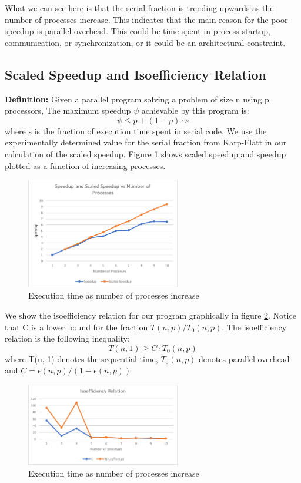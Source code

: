 \documentclass{article}
\begin{document}
\medskip
\noindent
What we can see here is that the serial fraction is trending upwards as the 
number of processes increase. This indicates that the main reason for the poor 
speedup is parallel overhead. This could be time spent in process startup, 
communication, or synchronization, or it could be an architectural constraint.

\subsection{Scaled Speedup and Isoefficiency Relation}

\medskip
\noindent
\textbf{Definition:} Given a parallel program solving a problem of size n using 
p processors, The maximum speedup $\psi$ achievable by this program is:
\[\psi \leq p+(1-p) \cdot s\] where s is the fraction of execution time spent in
serial code. We  use the experimentally determined value for the serial fraction
from Karp-Flatt in our calculation of the scaled speedup. Figure 
\ref{fig:scaled_speedup} shows scaled speedup and speedup plotted as a function 
of increasing processes.

\begin{figure}[ht]
	\centering
    \includegraphics[width=0.6\textwidth]{scaled_speedup.png}
    \caption{Execution time as number of processes increase}
    \label{fig:scaled_speedup}
\end{figure}

\medskip
\noindent
We show the isoefficiency relation for our program graphically in figure 
\ref{fig:isoefficiency}. Notice that C is a lower bound for the fraction 
$T(n,p)/T_0(n,p)$. The isoefficiency relation is the following inequality:
\[T(n,1) \geq C \cdot T_0(n,p)\]
where T(n, 1) denotes the sequential time, $T_0(n,p)$ denotes parallel overhead 
and $C = \epsilon(n,p)/(1-\epsilon(n,p))$

\begin{figure}[ht]
	\centering
    \includegraphics[width=0.6\textwidth]{isoefficiency.png}
    \caption{Execution time as number of processes increase}
    \label{fig:isoefficiency}
\end{figure}
\end{document}
